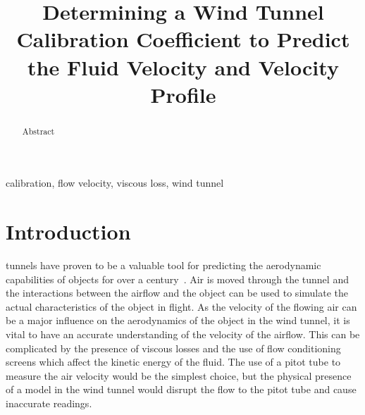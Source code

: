 \documentclass[journal,letterpaper]{IEEEtran}
\begin{document}
\title{Determining a Wind Tunnel Calibration Coefficient to Predict the Fluid Velocity and Velocity Profile}

\author{
}

\maketitle
\thispagestyle{empty}

\begin{abstract}
Abstract
\end{abstract}

\begin{IEEEkeywords}
calibration, flow velocity, viscous loss, wind tunnel
\end{IEEEkeywords}


\section{Introduction}


 tunnels have proven to be a valuable tool for predicting the aerodynamic capabilities of objects for over a century~\cite{lecture}.
Air is moved through the tunnel and the interactions between the airflow and the object can be used to simulate the actual characteristics of the object in flight.
As the velocity of the flowing air can be a major influence on the aerodynamics of the object in the wind tunnel, it is vital to have an accurate understanding of the velocity of the airflow.
This can be complicated by the presence of viscous losses and the use of flow conditioning screens which affect the kinetic energy of the fluid.
The use of a pitot tube to measure the air velocity would be the simplest choice, but the physical presence of a model in the wind tunnel would disrupt the flow to the pitot tube and cause inaccurate readings.
\end{document}
